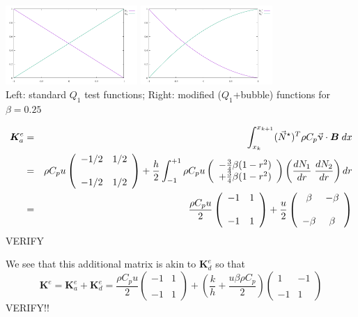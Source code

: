 \begin{center}
\includegraphics[width=5cm]{images/supg/bubble1}
\includegraphics[width=5cm]{images/supg/bubble2}\\
{\captionfont Left: standard $Q_1$ test functions; Right: modified ($Q_1$+bubble) functions
for $\beta=0.25$}
\end{center}


\begin{eqnarray}
{\bm K}_a^e 
&=& \int_{x_k}^{x_{k+1}}   ({\vec N}^\star)^T \rho C_p \vec\upnu \cdot {\bm B} \; dx  \nonumber\\
&=& 
\rho C_p u
\left(
\begin{array}{cc}
-1/2 & 1/2 \\ \\
-1/2 & 1/2 
\end{array}
\right)
+
\frac{h}{2}
\int_{-1}^{+1}
\rho C_p u
\left(\begin{array}{c}
-\frac{3}{4}\beta(1-r^2) \\ +\frac{3}{4}\beta(1-r^2) 
\end{array}\right)
\left( \frac{dN_1}{dr} \; \frac{dN_2}{dr} \right)  dr \\
&=&
\frac{\rho C_p u}{2}
\left(
\begin{array}{cc}
-1 & 1 \\ \\
-1 & 1 
\end{array}
\right)
+
\frac{u}{2}
\left(
\begin{array}{cc}
\beta & -\beta \\ \\
-\beta & \beta
\end{array}
\right)
\end{eqnarray}
VERIFY

We see that this additional matrix is akin to ${\bm K}_d^e$
so that 
\[
{\bm K}^e 
= {\bm K}_a^e + {\bm K}_d^e 
= \frac{\rho C_p u}{2}
\left(
\begin{array}{cc}
-1 & 1 \\ \\
-1 & 1 
\end{array}
\right)
+
(\frac{k}{h} + \frac{u \beta \rho C_p}{2})
\left(
\begin{array}{cc}
1 & -1 \\ \\
-1 & 1 
\end{array}
\right)
\]
VERIFY!!

